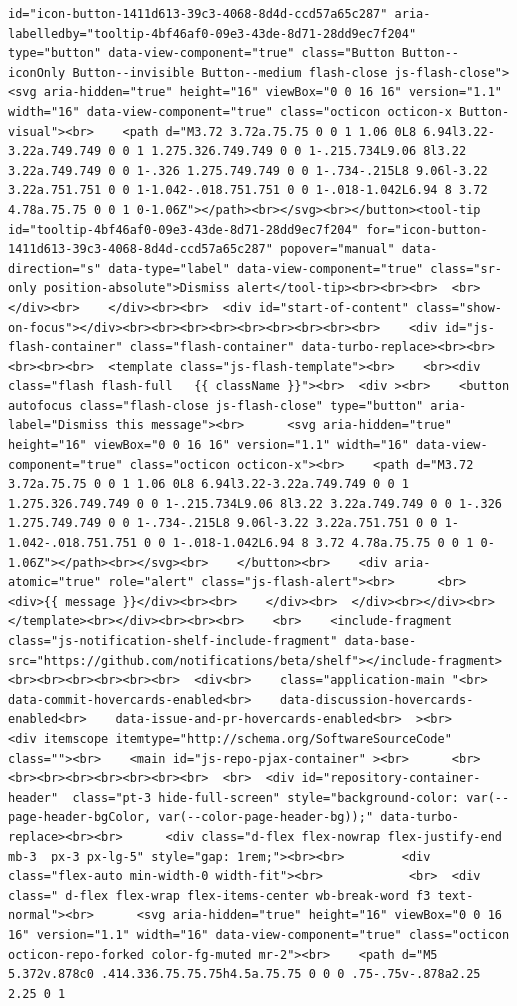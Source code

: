 \documentclass[
  letterpaper,
]{book}
\begin{document}
\begin{verbatim}
id="icon-button-1411d613-39c3-4068-8d4d-ccd57a65c287" aria-labelledby="tooltip-4bf46af0-09e3-43de-8d71-28dd9ec7f204" type="button" data-view-component="true" class="Button Button--iconOnly Button--invisible Button--medium flash-close js-flash-close">  <svg aria-hidden="true" height="16" viewBox="0 0 16 16" version="1.1" width="16" data-view-component="true" class="octicon octicon-x Button-visual"><br>    <path d="M3.72 3.72a.75.75 0 0 1 1.06 0L8 6.94l3.22-3.22a.749.749 0 0 1 1.275.326.749.749 0 0 1-.215.734L9.06 8l3.22 3.22a.749.749 0 0 1-.326 1.275.749.749 0 0 1-.734-.215L8 9.06l-3.22 3.22a.751.751 0 0 1-1.042-.018.751.751 0 0 1-.018-1.042L6.94 8 3.72 4.78a.75.75 0 0 1 0-1.06Z"></path><br></svg><br></button><tool-tip id="tooltip-4bf46af0-09e3-43de-8d71-28dd9ec7f204" for="icon-button-1411d613-39c3-4068-8d4d-ccd57a65c287" popover="manual" data-direction="s" data-type="label" data-view-component="true" class="sr-only position-absolute">Dismiss alert</tool-tip><br><br><br>  <br></div><br>    </div><br><br>  <div id="start-of-content" class="show-on-focus"></div><br><br><br><br><br><br><br><br><br>    <div id="js-flash-container" class="flash-container" data-turbo-replace><br><br><br><br><br>  <template class="js-flash-template"><br>    <br><div class="flash flash-full   {{ className }}"><br>  <div ><br>    <button autofocus class="flash-close js-flash-close" type="button" aria-label="Dismiss this message"><br>      <svg aria-hidden="true" height="16" viewBox="0 0 16 16" version="1.1" width="16" data-view-component="true" class="octicon octicon-x"><br>    <path d="M3.72 3.72a.75.75 0 0 1 1.06 0L8 6.94l3.22-3.22a.749.749 0 0 1 1.275.326.749.749 0 0 1-.215.734L9.06 8l3.22 3.22a.749.749 0 0 1-.326 1.275.749.749 0 0 1-.734-.215L8 9.06l-3.22 3.22a.751.751 0 0 1-1.042-.018.751.751 0 0 1-.018-1.042L6.94 8 3.72 4.78a.75.75 0 0 1 0-1.06Z"></path><br></svg><br>    </button><br>    <div aria-atomic="true" role="alert" class="js-flash-alert"><br>      <br>      <div>{{ message }}</div><br><br>    </div><br>  </div><br></div><br>  </template><br></div><br><br><br>    <br>    <include-fragment class="js-notification-shelf-include-fragment" data-base-src="https://github.com/notifications/beta/shelf"></include-fragment><br><br><br><br><br><br>  <div<br>    class="application-main "<br>    data-commit-hovercards-enabled<br>    data-discussion-hovercards-enabled<br>    data-issue-and-pr-hovercards-enabled<br>  ><br>        <div itemscope itemtype="http://schema.org/SoftwareSourceCode" class=""><br>    <main id="js-repo-pjax-container" ><br>      <br>      <br><br><br><br><br><br><br>  <br>  <div id="repository-container-header"  class="pt-3 hide-full-screen" style="background-color: var(--page-header-bgColor, var(--color-page-header-bg));" data-turbo-replace><br><br>      <div class="d-flex flex-nowrap flex-justify-end mb-3  px-3 px-lg-5" style="gap: 1rem;"><br><br>        <div class="flex-auto min-width-0 width-fit"><br>            <br>  <div class=" d-flex flex-wrap flex-items-center wb-break-word f3 text-normal"><br>      <svg aria-hidden="true" height="16" viewBox="0 0 16 16" version="1.1" width="16" data-view-component="true" class="octicon octicon-repo-forked color-fg-muted mr-2"><br>    <path d="M5 5.372v.878c0 .414.336.75.75.75h4.5a.75.75 0 0 0 .75-.75v-.878a2.25 2.25 0 1 
\end{verbatim}
\end{document}
